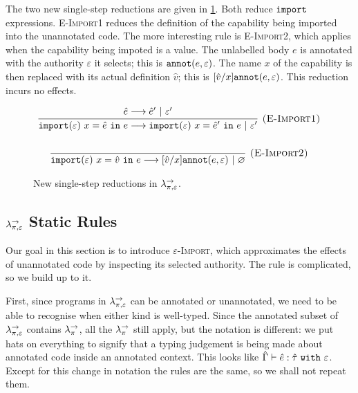 The two new single-step reductions are given in \ref{fig:opercalc_reductions}. Both reduce $\mathtt{import}$ expressions. \textsc{E-Import1} reduces the definition of the capability being imported into the unannotated code. The more interesting rule is \textsc{E-Import2}, which applies when the capability being impoted is a value. The unlabelled body $e$ is annotated with the authority $\varepsilon$ it selects; this is $\mathtt{annot}(e, \varepsilon)$. The name $x$ of the capability is then replaced with its actual definition $\hat v$; this is $[\hat v/x]\mathtt{annot}(e, \varepsilon)$. This reduction incurs no effects.

\begin{figure}[h]

\noindent
{}

\[
\begin{array}{c}
\infer[\textsc{(E-Import1)}]
	{\kwa{import}(\varepsilon)~x = \hat e~\kw{in} e \longrightarrow \kwa{import}(\varepsilon)~x = \hat e'~\kw{in} e~|~\varepsilon'}
	{\hat e \longrightarrow \hat e'~|~\varepsilon'}\\[4ex]

\infer[\textsc{(E-Import2)}]
	{\kwa{import}(\varepsilon)~x = \hat v~\kw{in} e \longrightarrow [\hat v/x]\kwa{annot}(e, \varepsilon)~|~\varnothing}
	{}

\end{array}
\]


\vspace{-7pt}
\caption{New single-step reductions in $\lambda^{\rightarrow}_{\pi, \varepsilon}$.}
\label{fig:opercalc_reductions}
\end{figure}


\subsection{$\lambda^{\rightarrow}_{\pi, \varepsilon}$ Static Rules}

Our goal in this section is to introduce \textsc{$\varepsilon$-Import}, which approximates the effects of unannotated code by inspecting its selected authority. The rule is complicated, so we build up to it.

First, since programs in $\lambda^{\rightarrow}_{\pi, \varepsilon}$ can be annotated or unannotated, we need to be able to recognise when either kind is well-typed. Since the annotated subset of $\lambda^{\rightarrow}_{\pi, \varepsilon}$ contains $\lambda^{\rightarrow}_{\pi}$, all the $\lambda^{\rightarrow}_{\pi}$ still apply, but the notation is different: we put hats on everything to signify that a typing judgement is being made about annotated code inside an annotated context. This looks like $\hat \Gamma \vdash \hat e: \hat \tau~\mathtt{with}~ \varepsilon$. Except for this change in notation the rules are the same, so we shall not repeat them. 

